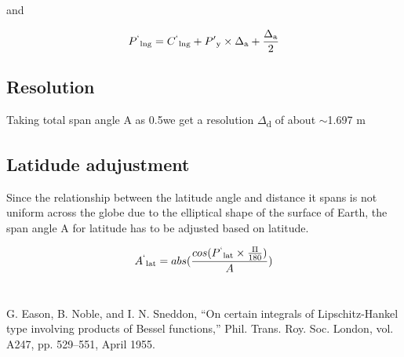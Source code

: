 \documentclass[conference]{IEEEtran}
\begin{document}
and

\begin{equation}P\textsuperscript{`}\textsubscript{lng} = C\textsuperscript{`}\textsubscript{lng} + P'\textsubscript{y} \times \Delta\textsubscript{a} + \frac{\Delta\textsubscript{a}}{2}\end{equation}

\subsection{Resolution}
Taking total span angle A as 0.5\degree we get a resolution $\Delta$\textsubscript{d} of about $\sim$1.697 m

\subsection{Latidude adujustment}
Since the relationship between the latitude angle and distance it spans is not uniform across the globe due to the elliptical shape of the surface of Earth\cite{b1}, the span angle A for latitude has to be adjusted based on latitude.

\begin{equation}A\textsuperscript{`}\textsubscript{lat} = abs(\frac{cos(P\textsuperscript{`}\textsubscript{lat} \times \frac{\Pi}{180})}{A})\end{equation}
\\
\begin{thebibliography}{00}
 G. Eason, B. Noble, and I. N. Sneddon, ``On certain integrals of Lipschitz-Hankel type involving products of Bessel functions,'' Phil. Trans. Roy. Soc. London, vol. A247, pp. 529--551, April 1955.
\end{thebibliography}
\end{document}
